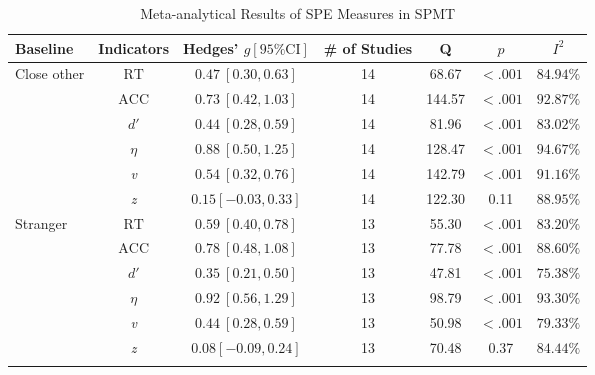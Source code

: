 \documentclass[sn-apa]{sn-jnl}%
\theoremstyle{thmstyleone}%
\theoremstyle{thmstyletwo}%
\theoremstyle{thmstylethree}%
\begin{document}
\begin{table}[!htbp]
	\caption{Meta-analytical Results of SPE Measures in SPMT}\label{table:metaresult}
	\label{table:Meta}%
	\begin{tabular}{@{}lcccccc@{}}
		\toprule
		Baseline & Indicators & Hedges’ $g[95\% \text{CI}]$& \# of Studies & Q & $p$ & $I^2$\\
		\midrule
		Close other&  $\text{RT}$& $0.47\ [0.30, 0.63]$& 14& 68.67 & $<.001$& $84.94\%$ \\
		&  $\text{ACC}$ & $0.73\ [0.42, 1.03]$& 14&144.57&$<.001$& $92.87\%$ \\
		&  $d'$ &$0.44\ [0.28, 0.59] $&14&81.96&$<.001$&$83.02\%$ \\
		&  $\eta$ & $0.88\ [0.50, 1.25]$&14&128.47&$<.001$&$94.67\%$ \\
		&  \textit{v} &$0.54\ [0.32, 0.76]$ &14&142.79&$<.001$&$91.16\%$ \\
		&  \textit{z} & $0.15 [-0.03, 0.33]$&14&122.30&0.11&$88.95\%$ \\
		
		Stranger &  $\text{RT}$ &$0.59\ [0.40, 0.78]$ &13&55.30&$<.001$&$83.20\%$ \\
		&  $\text{ACC}$ &$0.78\ [0.48, 1.08]$ &13&77.78&$<.001$&$88.60\%$ \\
		&  $d'$ & $0.35\ [0.21, 0.50]$ &13&47.81&$<.001$&$75.38\%$ \\
		&  $\eta$ & $0.92\ [0.56, 1.29]$&13&98.79&$<.001$&$93.30\%$ \\
		&  \textit{v} & $0.44\ [0.28, 0.59]$&13&50.98&$<.001$&$79.33\%$ \\
		&  \textit{z} & $0.08 [-0.09, 0.24]$&13&70.48&0.37&$84.44\%$ \\
		\botrule
	\end{tabular}
\end{table}
\end{document}
